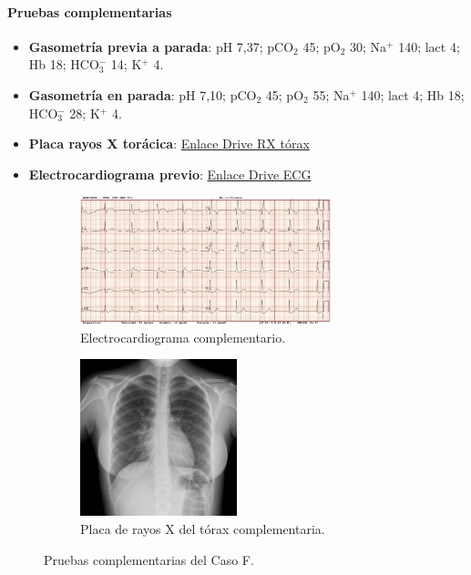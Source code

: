 \paragraph{Pruebas complementarias}
\begin{itemize}[topsep=0pt, partopsep=0pt,itemsep=0pt,parsep=0pt]
    \item \textbf{Gasometría previa a parada}: pH 7,37; pCO$_2$ 45; pO$_2$ 30; Na$^+$ 140; lact 4; Hb 18; HCO$_3^-$ 14; K$^+$ 4.
    \item \textbf{Gasometría en parada}: pH 7,10; pCO$_2$ 45; pO$_2$ 55; Na$^+$ 140; lact 4; Hb 18; HCO$_3^-$ 28; K$^+$ 4.
    \item \textbf{Placa rayos X torácica}: \href{https://drive.google.com/file/d/1lyg9P5pVMmjxd8ZkjwH\_SYt4QF4bie\_6/view?usp=share\_link}{Enlace Drive RX tórax}
    \item \textbf{Electrocardiograma previo}: \href{https://drive.google.com/file/d/1Wg0E\_7Jy2S\_in\_G2v75y7vmb-ilkWIRF/view?usp=share\_link}{Enlace Drive ECG}
\end{itemize}

\begin{figure}[hptb]
    \centering
    \begin{subfigure}{.5\textwidth}
      \centering
      \includegraphics[width=0.8\textwidth]{./imagenes/UCIDoc-SVICasoFECG.png}
      \caption{\label{fig:Brusilov:SVI:CasoCECG}Electrocardiograma complementario.}
    \end{subfigure}%
    \begin{subfigure}{.5\textwidth}
      \centering
      \includegraphics[width=0.5\textwidth]{./imagenes/UCIDoc-SVICasoFRXTorax.png}
      \caption{\label{fig:Brusilov:SVI:CasoCRXTorax}Placa de rayos X del tórax complementaria.}
    \end{subfigure}
    \caption{\label{fig:Brusilov:SVI:PruebasCasoC}Pruebas complementarias del Caso F.}
\end{figure}

